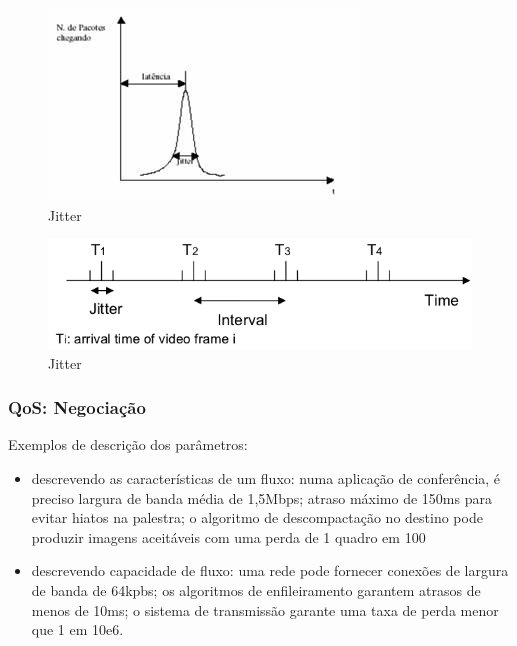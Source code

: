 \documentclass[]{beamer}
\begin{document}
\begin{frame}
 
  \begin{figure}[hbtp]
   \caption{Jitter\cite{site2:2011}}
   \begin{center}
    \includegraphics[scale=1.2]{jitter.jpg}
   \end{center}
  \end{figure}

\end{frame}

\begin{frame}
   \begin{figure}[hbtp]
  \caption{Jitter\cite{Mingyang:2002}}
  \begin{center}
   \includegraphics[scale=0.48]{jitter2.png}
  \end{center}
 \end{figure}
\end{frame}

\begin{frame}
  \frametitle{QoS: Negociação}
Exemplos de descrição dos parâmetros: 
\begin{itemize}
 \item descrevendo as características de um fluxo: numa aplicação de conferência,
é preciso largura de banda média de 1,5Mbps; atraso máximo
de 150ms para evitar hiatos na palestra; o algoritmo de descompactação
no destino pode produzir imagens aceitáveis com uma perda de 1 quadro em 100
  \item descrevendo capacidade de fluxo: uma rede pode fornecer conexões de largura de banda
de 64kpbs; os algoritmos de enfileiramento garantem atrasos de menos de 10ms; o sistema
de transmissão garante uma taxa de perda menor que 1 em 10e6.
\end{itemize}
\end{frame}
\end{document}
